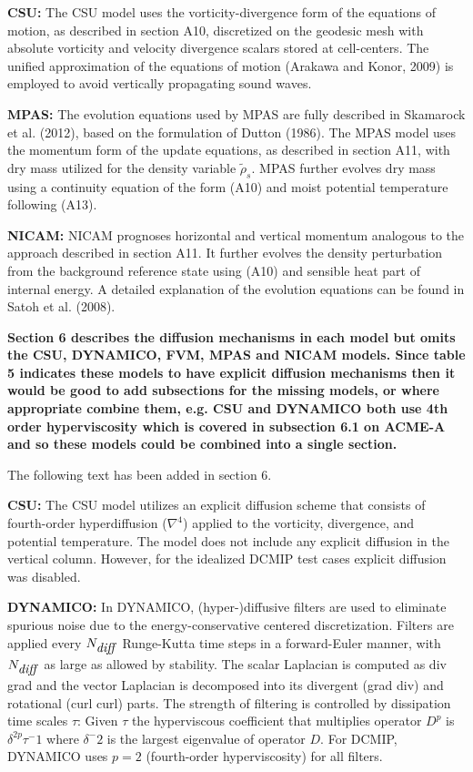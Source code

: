 \documentclass{article}
\begin{document}
\textbf{CSU:}  {\color{blue}The CSU model uses the vorticity-divergence form of the equations of motion, as described in section A10, discretized on the geodesic mesh with absolute vorticity and velocity divergence scalars stored at cell-centers.  The unified approximation of the equations of motion (Arakawa and Konor, 2009) is employed to avoid vertically propagating sound waves.}

\textbf{MPAS:}  {\color{blue}The evolution equations used by MPAS are fully described in Skamarock et al. (2012), based on the formulation of Dutton (1986). The MPAS model uses the momentum form of the update equations, as described in section A11, with dry mass utilized for the density variable $\tilde{\rho}_s$. MPAS further evolves dry mass using a continuity equation of the form (A10) and moist potential temperature following (A13).}

\textbf{NICAM:}  {\color{blue}NICAM prognoses horizontal and vertical momentum analogous to the approach described in section A11. It further evolves the density perturbation from the background reference state using (A10) and sensible heat part of internal energy. A detailed explanation of the evolution equations can be found in Satoh et al. (2008).}

\textbf{{Section 6 describes the diffusion mechanisms in each model but omits the
CSU, DYNAMICO, FVM, MPAS and NICAM models. Since table 5 indicates
these models to have explicit diffusion mechanisms then it would be good
to add subsections for the missing models, or where appropriate combine
them, e.g. CSU and DYNAMICO both use 4th order hyperviscosity which
is covered in subsection 6.1 on ACME-A and so these models could be
combined into a single section.}}

The following text has been added in section 6.

\textbf{CSU:}  {\color{blue}The CSU model utilizes an explicit diffusion scheme that consists of fourth-order hyperdiffusion ($\nabla^4$) applied to the vorticity, divergence, and potential temperature. The model does not include any explicit diffusion in the vertical column. However, for the idealized DCMIP test cases explicit diffusion was disabled.}

\textbf{DYNAMICO:}  {\color{blue}In DYNAMICO, (hyper-)diffusive filters are used to eliminate spurious noise due to the energy-conservative centered discretization. Filters are applied every $N_{\mbox{\textit{diff}}}$ Runge-Kutta time steps in a forward-Euler manner, with $N_{\mbox{\textit{diff}}}$ as large as allowed by stability. The scalar Laplacian is computed as div grad and the vector Laplacian is decomposed into its divergent (grad div) and rotational (curl curl) parts. The strength of filtering is controlled by dissipation time scales $\tau$:  Given $\tau$ the hyperviscous coefficient that multiplies operator $D^p$ is  $\delta^{2p} \tau^-1$ where $\delta^-2$ is the largest eigenvalue of operator $D$. For DCMIP, DYNAMICO uses $p=2$ (fourth-order hyperviscosity) for all filters.}
\end{document}
